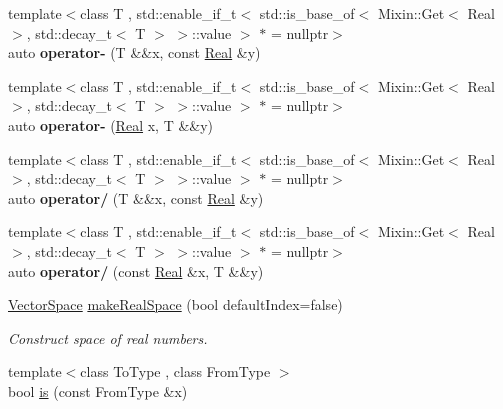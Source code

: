 \begin{DoxyCompactItemize}
\item 
\hypertarget{namespaceSpacy_a0ce5976cd9ab32a6eecaa92fc3ea803a}{{\footnotesize template$<$class T , std\-::enable\-\_\-if\-\_\-t$<$ std\-::is\-\_\-base\-\_\-of$<$ Mixin\-::\-Get$<$ Real $>$, std\-::decay\-\_\-t$<$ T $>$ $>$\-::value $>$ $\ast$  = nullptr$>$ }\\auto {\bfseries operator-\/} (\-T \&\&x, const \hyperlink{classSpacy_1_1Real}{\-Real} \&y)}\label{namespaceSpacy_a0ce5976cd9ab32a6eecaa92fc3ea803a}

\item 
\hypertarget{namespaceSpacy_a92fe6ff3c620feb4c8299e6ac3959a42}{{\footnotesize template$<$class T , std\-::enable\-\_\-if\-\_\-t$<$ std\-::is\-\_\-base\-\_\-of$<$ Mixin\-::\-Get$<$ Real $>$, std\-::decay\-\_\-t$<$ T $>$ $>$\-::value $>$ $\ast$  = nullptr$>$ }\\auto {\bfseries operator-\/} (\hyperlink{classSpacy_1_1Real}{\-Real} x, \-T \&\&y)}\label{namespaceSpacy_a92fe6ff3c620feb4c8299e6ac3959a42}

\item 
\hypertarget{namespaceSpacy_aeec0910b94a07ae8dfe79f971ea8425a}{{\footnotesize template$<$class T , std\-::enable\-\_\-if\-\_\-t$<$ std\-::is\-\_\-base\-\_\-of$<$ Mixin\-::\-Get$<$ Real $>$, std\-::decay\-\_\-t$<$ T $>$ $>$\-::value $>$ $\ast$  = nullptr$>$ }\\auto {\bfseries operator/} (\-T \&\&x, const \hyperlink{classSpacy_1_1Real}{\-Real} \&y)}\label{namespaceSpacy_aeec0910b94a07ae8dfe79f971ea8425a}

\item 
\hypertarget{namespaceSpacy_af180e266f73b104cb351ec67778b8cfd}{{\footnotesize template$<$class T , std\-::enable\-\_\-if\-\_\-t$<$ std\-::is\-\_\-base\-\_\-of$<$ Mixin\-::\-Get$<$ Real $>$, std\-::decay\-\_\-t$<$ T $>$ $>$\-::value $>$ $\ast$  = nullptr$>$ }\\auto {\bfseries operator/} (const \hyperlink{classSpacy_1_1Real}{\-Real} \&x, \-T \&\&y)}\label{namespaceSpacy_af180e266f73b104cb351ec67778b8cfd}

\item 
\hyperlink{classSpacy_1_1VectorSpace}{\-Vector\-Space} \hyperlink{namespaceSpacy_a4f4b05902653c5fc8d6411142dcb352f}{make\-Real\-Space} (bool default\-Index=false)
\begin{DoxyCompactList}\small\item\em \-Construct space of real numbers. \end{DoxyCompactList}\item 
\hypertarget{namespaceSpacy_ae44bfd08fa77272bab4149665b26233a}{{\footnotesize template$<$class To\-Type , class From\-Type $>$ }\\bool \hyperlink{namespaceSpacy_ae44bfd08fa77272bab4149665b26233a}{is} (const \-From\-Type \&x)}\label{namespaceSpacy_ae44bfd08fa77272bab4149665b26233a}


\end{DoxyCompactItemize}
